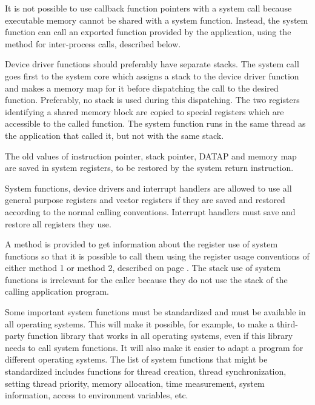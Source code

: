 \documentclass[forwardcom.tex]{subfiles}
\begin{document}
It is not possible to use callback function pointers with a system call because executable memory cannot be shared with a system function. Instead, the system function can call an exported function provided by the application, using the method for inter-process calls, described below.
\vspace{2mm}

Device driver functions should preferably have separate stacks. The system call goes first to the system core which assigns a stack to the device driver function and makes a memory map for it before dispatching the call to the desired function. Preferably, no stack is used during this dispatching. The two registers identifying a shared memory block are copied to special registers which are accessible to the called function. The system function runs in the same thread as the application that called it, but not with the same stack. 
\vspace{2mm}

The old values of instruction pointer, stack pointer, DATAP and memory map are saved in system registers, to be restored by the system return instruction. 
\vspace{2mm}

System functions, device drivers and interrupt handlers are allowed to use all general purpose registers and vector registers if they are saved and restored according to the normal calling conventions. Interrupt handlers must save and restore all registers they use. 
\vspace{2mm}

A method is provided to get information about the register use of system functions so that it is possible to call them using the register usage conventions of either method 1 or method 2, described on page \pageref{registerUsageConvention}. The stack use of system functions is irrelevant for the caller because they do not use the stack of the calling application program. 
\vspace{2mm}

Some important system functions must be standardized and must be available in all operating systems. This will make it possible, for example, to make a third-party function library that works in all operating systems, even if this library needs to call system functions. It will also make it easier to adapt a program for different operating systems. The list of system functions that might be standardized includes functions for thread creation, thread synchronization, setting thread priority, memory allocation, time measurement, system information, access to environment variables, etc. 
\vspace{2mm}
\end{document}
